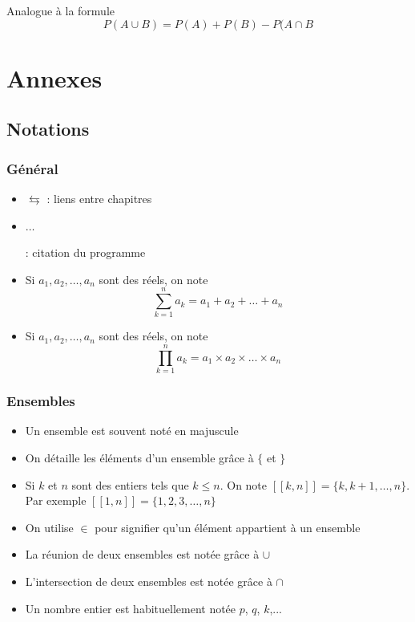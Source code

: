 \newline

\begin{remarque}
Analogue à la formule 
$$P(A\cup B) = P(A) + P(B) - P(A\cap B$$
\end{remarque}

\newline
\appendix
\part{Annexes}
\chapter{Notations}
\section*{Général}
\begin{itemize}
\item $\leftrightarrows$ : liens entre chapitres
\item \begin{prog} $\ldots$ \end{prog} : citation du programme
\item Si $a_1,a_2,\ldots,a_n$ sont des réels, on note $$\sum_{k=1}^n a_k = a_1+a_2+\ldots+a_n $$
\item Si $a_1,a_2,\ldots,a_n$ sont des réels, on note $$\prod_{k=1}^n a_k = a_1\times a_2\times \ldots\times a_n $$
\end{itemize}
\section*{Ensembles}
\begin{itemize}
\item Un ensemble est souvent noté en majuscule
\item On détaille les éléments d'un ensemble grâce à $\{$ et $\}$
\item Si $k$ et $n$ sont des entiers tels que $k\leq n$. On note $[\![k,n]\!] = \{k,k+1,\ldots,n\}$. Par exemple $[\![1,n]\!] = \{1,2,3,\ldots,n\}$
\item On utilise $\in$ pour signifier qu'un élément appartient à un ensemble
\item La réunion de deux ensembles est notée grâce à $\cup$
\item L'intersection de deux ensembles est notée grâce à $\cap$
\item Un nombre entier est habituellement notée $p$, $q$, $k$,...
\end{itemize}
